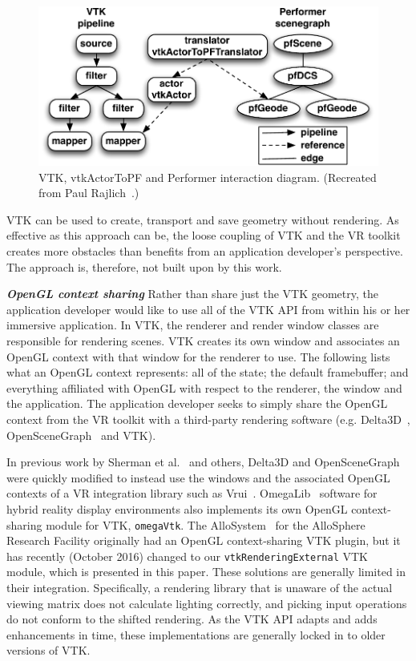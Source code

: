 \begin{figure}[h!]
  \centering
  \includegraphics[width=\linewidth]{images/vtkActorToPF.pdf}
  \caption{VTK, vtkActorToPF and Performer interaction diagram. (Recreated from Paul Rajlich~\cite{Leigh98limbo/vtk}.)}
  \label{fig:vtkActorToPF}
\end{figure}

VTK can be used to create, transport and save geometry without rendering. As effective as this approach can be, the loose coupling of VTK and the VR toolkit creates more obstacles than benefits from an application developer's perspective. The approach is, therefore, not built upon by this work.

\textbf{\textit{OpenGL context sharing}} Rather than share just the VTK geometry, the application developer would like to use all of the VTK API from within his or her immersive application.
In VTK, the renderer and render window classes are responsible for rendering scenes.
VTK creates its own window and associates an OpenGL context with that window for the renderer to use.
The following lists what an OpenGL context represents: all of the state; the default framebuffer; and everything affiliated with OpenGL with respect to the renderer, the window and the application.
The application developer seeks to simply share the OpenGL context from the VR toolkit with a third-party rendering software (e.g. Delta3D~\cite{McDowell:2006}, OpenSceneGraph~\cite{Wang:2010} and VTK). 

In previous work by Sherman et al.~\cite{Sherman:2010} and others, Delta3D
and OpenSceneGraph were quickly modified to instead use the windows and the associated
OpenGL contexts of a VR integration library such as Vrui~\cite{Kreylos:2006}.  
OmegaLib~\cite{Febretti:2014} software for hybrid reality display environments also implements its own OpenGL context-sharing module for VTK, \texttt{omegaVtk}. The AlloSystem~\cite{Amatriain:2009} for the AlloSphere Research Facility originally had an OpenGL context-sharing VTK plugin, but it has recently (October 2016) changed to our \texttt{vtkRenderingExternal} VTK module, which is presented in this paper.
These solutions are generally limited in their integration.
Specifically, a rendering library that is unaware of the actual
viewing matrix does not calculate lighting correctly, and
picking input operations do not conform to the shifted rendering. As the VTK API adapts and adds enhancements in time, these implementations are generally locked in to older versions of VTK.

